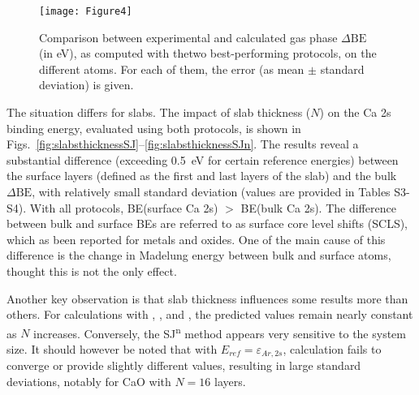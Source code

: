 \documentclass[journal=jpccck,manuscript=article]{achemso}
\def\dbe{\ensuremath{\Delta\text{BE}}}
\begin{document}
\begin{figure}[!h]
	\centering
	\texttt{[image: Figure4]}
	\caption{Comparison between experimental and calculated gas phase \dbe{} (in \si{\electronvolt}), as computed with thetwo best-performing protocols, on the different atoms. For each of them, the error (as mean $\pm$ standard deviation) is given.}
	\label{fig:xps_C185}
\end{figure}


\clearpage

The situation differs for slabs. The impact of slab thickness ($N$) on the Ca 2s binding energy, evaluated using both protocols, is shown in Figs.~\ref{fig:slabsthicknessSJ}--\ref{fig:slabsthicknessSJn}. The results reveal a substantial difference (exceeding \SI{0.5}{\electronvolt} for certain reference energies) between the surface layers (defined as the first and last layers of the slab) and the bulk \dbe{}, with relatively small standard deviation (values are provided in Tables S3-S4). With all protocols, BE(surface Ca 2s) $>$ BE(bulk Ca 2s). The difference between bulk and surface BEs are referred to as surface core level shifts (SCLS),\cite{olovssonCorelevelShiftsComplex2006,bagusChemicalSignificanceXray2023} which as been reported for metals\cite{aldenInitioSurfaceCorelevel1993,weinertCorelevelShiftsBulk1995,olovssonCorelevelShiftsComplex2006} and oxides\cite{harmerSpeciesFormedCuprite2009,lousadaFirstStagesOxide2018,bagusRevisitingSurfaceCorelevel2019}. One of the main cause of this difference is the change in Madelung energy between bulk and surface atoms\cite{nelinSurfaceCorelevelBinding2014}, thought this is not the only effect\cite{bagusRevisitingSurfaceCorelevel2019,bagusChemicalSignificanceXray2023,bagusXrayPhotoelectronSpectroscopy2024}.

Another key observation is that slab thickness influences some results more than others. For calculations with , , and , the predicted values remain nearly constant as $N$ increases. Conversely, the SJ\textsuperscript{n} method appears very sensitive to the system size. It should however be noted that with $E_{ref}=\varepsilon_{Ar,2s}$, calculation fails to converge or provide slightly different values, resulting in large standard deviations, notably for CaO with $N=16$ layers. 
\end{document}
